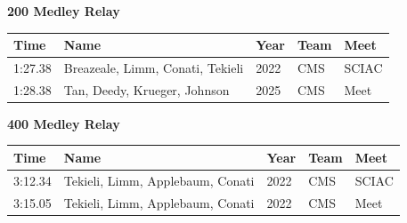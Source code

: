 \vspace{1.2em}
\noindent\begin{minipage}[t]{0.98\textwidth}
\centering
\textbf{\textcolor{teamprimary}{200 Medley Relay}}\par
\vspace{0.5em}
\centering
\small
\renewcommand{\arraystretch}{1.0}
\setlength{\tabcolsep}{4pt}
\begin{tabular}{@{}p{2.7cm}p{4.3cm}p{1.6cm}p{2.7cm}p{2.7cm}@{}}
\toprule
\textbf{Time} & \textbf{Name} & \textbf{Year} & \textbf{Team} & \textbf{Meet} \\
\midrule
1:27.38 & Breazeale, Limm, Conati, Tekieli & 2022 & CMS & SCIAC \\
1:28.38 & Tan, Deedy, Krueger, Johnson & 2025 & CMS & Meet \\
\bottomrule
\end{tabular}
\end{minipage}
\vspace{1.2em}
\noindent\begin{minipage}[t]{0.98\textwidth}
\centering
\textbf{\textcolor{teamprimary}{400 Medley Relay}}\par
\vspace{0.5em}
\centering
\small
\renewcommand{\arraystretch}{1.0}
\setlength{\tabcolsep}{4pt}
\begin{tabular}{@{}p{2.7cm}p{4.3cm}p{1.6cm}p{2.7cm}p{2.7cm}@{}}
\toprule
\textbf{Time} & \textbf{Name} & \textbf{Year} & \textbf{Team} & \textbf{Meet} \\
\midrule
3:12.34 & Tekieli, Limm, Applebaum, Conati & 2022 & CMS & SCIAC \\
3:15.05 & Tekieli, Limm, Applebaum, Conati & 2022 & CMS & Meet \\
\bottomrule
\end{tabular}
\end{minipage}
\clearpage

